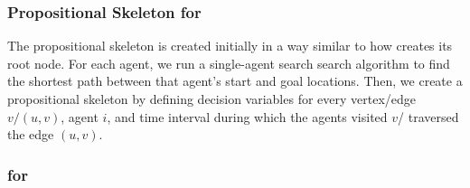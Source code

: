 \subsubsection{Propositional Skeleton for \mapfr}




The propositional skeleton is created initially in a way similar to how \ccbs creates its root \ct node. For each agent, we run a single-agent search search algorithm to find the shortest path between that agent's start and goal locations. 
Then, we create a propositional skeleton by defining decision variables for every vertex/edge $v/(u,v)$, agent $i$, and time interval during which the agents visited $v$/ traversed the edge $(u,v)$. 


\subsubsection{\decidet for \mapfr}



